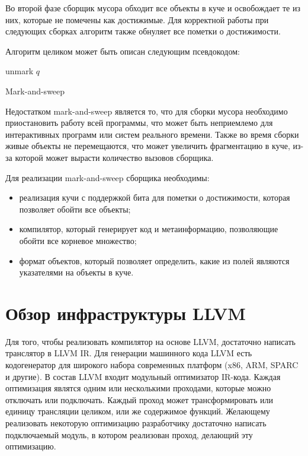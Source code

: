 \documentclass[14pt]{extarticle}
\begin{document}
Во второй фазе сборщик мусора обходит все объекты в куче и освобождает те из них, которые не помечены как достижимые. Для корректной работы при следующих сборках алгоритм также обнуляет все пометки о достижимости. 

Алгоритм целиком может быть описан следующим псевдокодом: 
\begin{algorithm}
\begin{algorithmic}[1]

    \State {}
  \EndFor
  \State {}
\EndFunction

    \State \Return
  \EndIf
    \State {}
  \EndFor
\EndFunction

    \Else
        \State unmark $q$
    \EndIf
  \EndFor
\EndFunction

\end{algorithmic}
\caption{Mark-and-sweep}
\end{algorithm}

\pagebreak
Недостатком mark-and-sweep является то, что для сборки мусора необходимо приостановить работу всей программы, что может быть неприемлемо для интерактивных программ или систем реального времени. Также во время сборки живые объекты не перемещаются, что может увеличить фрагментацию в куче, из-за которой может вырасти количество вызовов сборщика. 

Для реализации mark-and-sweep сборщика необходимы:
\begin{itemize}
  \item реализация кучи с поддержкой бита для пометки о достижимости, которая позволяет обойти все объекты;
  \item компилятор, который генерирует код и метаинформацию, позволяющие обойти все корневое множество;
  \item формат объектов, который позволяет определить, какие из полей являются указателями на объекты в куче.
\end{itemize}

\pagebreak
\section{Обзор инфраструктуры LLVM}
Для того, чтобы реализовать компилятор на основе LLVM, достаточно написать транслятор в LLVM IR. Для генерации машинного кода LLVM есть кодогенератор для широкого набора современных платформ (x86, ARM, SPARC и другие). В состав LLVM входит модульный оптимизатор IR-кода. Каждая оптимизация являтся одним или несколькими проходами, которые можно отключать или подключать. Каждый проход может трансформировать или единицу трансляции целиком, или же содержимое функций. Желающему реализовать некоторую оптимизацию разработчику достаточно написать подключаемый модуль, в котором реализован проход, делающий эту оптимизацию. 
\end{document}
